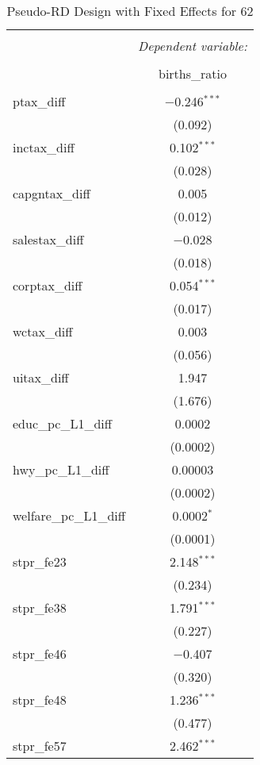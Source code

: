 
\begin{table}[!htbp] \centering 
  \caption{Pseudo-RD Design with Fixed Effects for  62} 
  \label{} 
\begin{tabular}{@{\extracolsep{5pt}}lc} 
\\[-1.8ex]\hline 
\hline \\[-1.8ex] 
 & \multicolumn{1}{c}{\textit{Dependent variable:}} \\ 
\cline{2-2} 
\\[-1.8ex] & births\_ratio \\ 
\hline \\[-1.8ex] 
 ptax\_diff & $-$0.246$^{***}$ \\ 
  & (0.092) \\ 
  inctax\_diff & 0.102$^{***}$ \\ 
  & (0.028) \\ 
  capgntax\_diff & 0.005 \\ 
  & (0.012) \\ 
  salestax\_diff & $-$0.028 \\ 
  & (0.018) \\ 
  corptax\_diff & 0.054$^{***}$ \\ 
  & (0.017) \\ 
  wctax\_diff & 0.003 \\ 
  & (0.056) \\ 
  uitax\_diff & 1.947 \\ 
  & (1.676) \\ 
  educ\_pc\_L1\_diff & 0.0002 \\ 
  & (0.0002) \\ 
  hwy\_pc\_L1\_diff & 0.00003 \\ 
  & (0.0002) \\ 
  welfare\_pc\_L1\_diff & 0.0002$^{*}$ \\ 
  & (0.0001) \\ 
  stpr\_fe23 & 2.148$^{***}$ \\ 
  & (0.234) \\ 
  stpr\_fe38 & 1.791$^{***}$ \\ 
  & (0.227) \\ 
  stpr\_fe46 & $-$0.407 \\ 
  & (0.320) \\ 
  stpr\_fe48 & 1.236$^{***}$ \\ 
  & (0.477) \\ 
  stpr\_fe57 & 2.462$^{***}$ \\ 

\end{tabular}
\end{table}
